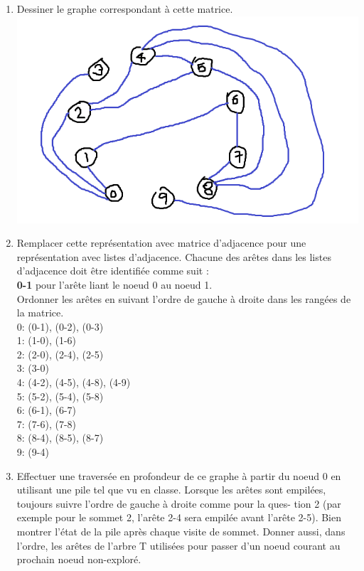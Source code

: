 \documentclass[12pt]{book}
\begin{document}
\begin{enumerate}
    
    \item Dessiner le graphe correspondant à cette matrice.\\
    \includegraphics[scale=0.80]{d8a1.png}
    
    \newpage
    
    \item Remplacer cette représentation avec matrice d’adjacence pour une représentation avec listes d’adjacence. Chacune des arêtes dans les listes d’adjacence doit être identifiée comme suit : \\
    \hspace*{10mm} \textbf{0-1} pour l’arête liant le noeud 0 au noeud 1.\\
    Ordonner les arêtes en suivant l’ordre de gauche à droite dans les rangées de la matrice.\\
    
    0: (0-1), (0-2), (0-3)\\
    1: (1-0), (1-6)\\
    2: (2-0), (2-4), (2-5)\\
    3: (3-0)\\
    4: (4-2), (4-5), (4-8), (4-9)\\
    5: (5-2), (5-4), (5-8)\\
    6: (6-1), (6-7)\\
    7: (7-6), (7-8)\\
    8: (8-4), (8-5), (8-7)\\
    9: (9-4)\\
    
    \item Effectuer une traversée en profondeur de ce graphe à partir du noeud 0 en utilisant une pile tel que vu en classe. Lorsque les arêtes sont empilées, toujours suivre l’ordre de gauche à droite comme pour la ques- tion 2 (par exemple pour le sommet 2, l’arête 2-4 sera empilée avant l’arête 2-5). Bien montrer l’état de la pile après chaque visite de sommet. Donner aussi, dans l’ordre, les arêtes de l’arbre T utilisées pour passer d’un noeud courant au prochain noeud non-exploré.
    \begin{tabbing}
    

\end{tabbing}
\end{enumerate}
\end{document}
